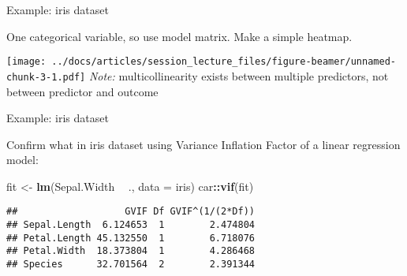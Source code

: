 \documentclass[
  ignorenonframetext,
]{beamer}
\newenvironment{Shaded}{\begin{snugshade}}{\end{snugshade}}
\newcommand{\CommentTok}[1]{\textcolor[rgb]{0.56,0.35,0.01}{\textit{#1}}}
\newcommand{\DataTypeTok}[1]{\textcolor[rgb]{0.13,0.29,0.53}{#1}}
\newcommand{\DecValTok}[1]{\textcolor[rgb]{0.00,0.00,0.81}{#1}}
\newcommand{\KeywordTok}[1]{\textcolor[rgb]{0.13,0.29,0.53}{\textbf{#1}}}
\newcommand{\NormalTok}[1]{#1}
\newcommand{\OperatorTok}[1]{\textcolor[rgb]{0.81,0.36,0.00}{\textbf{#1}}}
\newcommand{\StringTok}[1]{\textcolor[rgb]{0.31,0.60,0.02}{#1}}
\begin{document}
\begin{frame}[fragile]{Example: iris dataset}
\protect\hypertarget{example-iris-dataset}{}

One categorical variable, so use model matrix. Make a simple heatmap.
\tiny

\begin{Shaded}
\end{Shaded}

\texttt{[image: ../docs/articles/session\_lecture\_files/figure-beamer/unnamed-chunk-3-1.pdf]}
\emph{Note:} multicollinearity exists between multiple predictors, not
between predictor and outcome

\end{frame}

\begin{frame}[fragile]{Example: iris dataset}
\protect\hypertarget{example-iris-dataset-1}{}

Confirm what in iris dataset using Variance Inflation Factor of a linear
regression model: \tiny

\begin{Shaded}
\begin{Highlighting}[]
\NormalTok{fit <-}\StringTok{ }\KeywordTok{lm}\NormalTok{(Sepal.Width }\OperatorTok{~}\StringTok{ }\NormalTok{., }\DataTypeTok{data =}\NormalTok{ iris)}
\NormalTok{car}\OperatorTok{::}\KeywordTok{vif}\NormalTok{(fit)}
\end{Highlighting}
\end{Shaded}

\begin{verbatim}
##                   GVIF Df GVIF^(1/(2*Df))
## Sepal.Length  6.124653  1        2.474804
## Petal.Length 45.132550  1        6.718076
## Petal.Width  18.373804  1        4.286468
## Species      32.701564  2        2.391344
\end{verbatim}

\end{frame}
\end{document}
